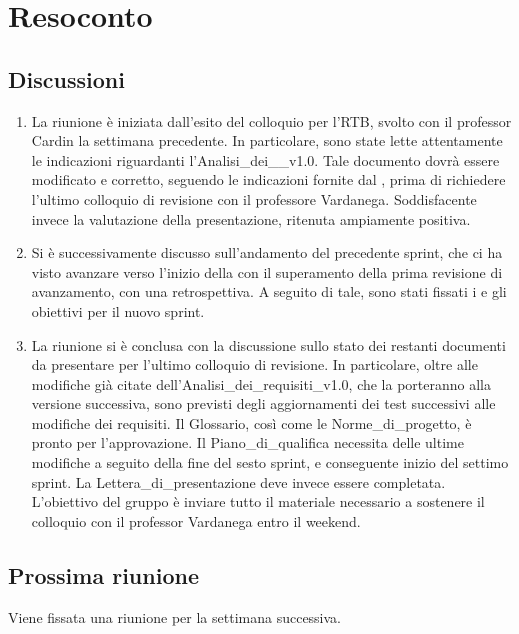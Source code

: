 \section{Resoconto} \label{sec:resoconto}
\subsection{Discussioni} \label{subsec:resdiscussione}
\begin{enumerate}
    \item La riunione è iniziata dall'esito del colloquio per l'RTB, svolto con il professor Cardin la settimana precedente. In particolare, sono state lette attentamente le indicazioni riguardanti l'Analisi\_dei\_\_v1.0. Tale documento dovrà essere modificato e corretto, seguendo le indicazioni fornite dal , prima di richiedere l'ultimo colloquio di revisione con il professore Vardanega. Soddisfacente invece la valutazione della presentazione, ritenuta ampiamente positiva.
    
    \item Si è successivamente discusso sull'andamento del precedente sprint, che ci ha visto avanzare verso l'inizio della  con il superamento della prima revisione di avanzamento, con una retrospettiva. A seguito di tale, sono stati fissati i  e gli obiettivi per il nuovo sprint.

    \item La riunione si è conclusa con la discussione sullo stato dei restanti documenti da presentare per l'ultimo colloquio di revisione. In particolare, oltre alle modifiche già citate dell'Analisi\_dei\_requisiti\_v1.0, che la porteranno alla versione successiva, sono previsti degli aggiornamenti dei test successivi alle modifiche dei requisiti. Il Glossario, così come le Norme\_di\_progetto, è pronto per l'approvazione. Il Piano\_di\_qualifica necessita delle ultime modifiche a seguito della fine del sesto sprint, e conseguente inizio del settimo sprint. La Lettera\_di\_presentazione deve invece essere completata.\\
    L'obiettivo del gruppo è inviare tutto il materiale necessario a sostenere il colloquio con il professor Vardanega entro il weekend.
    
\end{enumerate}

\subsection{Prossima riunione} \label{subsec:riunione}
Viene fissata una riunione per la settimana successiva.